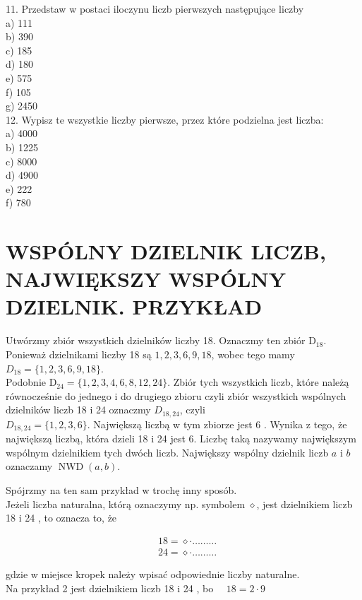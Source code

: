 \documentclass[10pt]{article}
\begin{document}
11. Przedstaw w postaci iloczynu liczb pierwszych następujące liczby\\
a) 111\\
b) 390\\
c) 185\\
d) 180\\
e) 575\\
f) 105\\
g) 2450\\
12. Wypisz te wszystkie liczby pierwsze, przez które podzielna jest liczba:\\
a) 4000\\
b) 1225\\
c) 8000\\
d) 4900\\
e) 222\\
f) 780

\section*{WSPÓLNY DZIELNIK LICZB, NAJWIĘKSZY WSPÓLNY DZIELNIK. PRZYKŁAD}
Utwórzmy zbiór wszystkich dzielników liczby 18. Oznaczmy ten zbiór \(\mathrm{D}_{18}\). Ponieważ dzielnikami liczby 18 są \(1,2,3,6,9,18\), wobec tego mamy \(D_{18}=\{1,2,3,6,9,18\}\).\\
Podobnie \(\mathrm{D}_{24}=\{1,2,3,4,6,8,12,24\}\). Zbiór tych wszystkich liczb, które należą równocześnie do jednego i do drugiego zbioru czyli zbiór wszystkich wspólnych dzielników liczb 18 i 24 oznaczmy \(D_{18,24}\), czyli\\
\(D_{18,24}=\{1,2,3,6\}\). Największą liczbą w tym zbiorze jest 6 . Wynika z tego, że największą liczbą, która dzieli 18 i 24 jest 6. Liczbę taką nazywamy największym wspólnym dzielnikiem tych dwóch liczb. Największy wspólny dzielnik liczb \(a\) i \(b\) oznaczamy \(\operatorname{NWD}(a, b)\).

Spójrzmy na ten sam przykład w trochę inny sposób.\\
Jeżeli liczba naturalna, którą oznaczymy np. symbolem \(\diamond\), jest dzielnikiem liczb 18 i 24 , to oznacza to, że

\[
\begin{aligned}
& 18=\diamond \cdot \ldots \ldots \ldots \\
& 24=\diamond \cdot \ldots \ldots \ldots
\end{aligned}
\]

gdzie w miejsce kropek należy wpisać odpowiednie liczby naturalne.\\
Na przykład 2 jest dzielnikiem liczb 18 i 24 , bo \(\quad 18=2 \cdot 9\)
\end{document}
